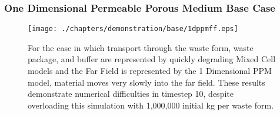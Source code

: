 \begin{frame}[ctb!]
  \frametitle{One Dimensional Permeable Porous Medium Base Case}
\begin{figure}[ht]
\texttt{[image: ./chapters/demonstration/base/1dppmff.eps]}
\caption[$^{235}U$ residence 1 Dimensional PPM Model.]{
For the case in which transport through the waste form, waste package, and 
buffer are represented by quickly degrading Mixed Cell models and the Far Field 
is represented by the 1 Dimensional PPM model, material moves very slowly into 
the far field. These results demonstrate numerical difficulties in timestep 10, 
despite overloading this simulation with 1,000,000 initial kg per waste form.
}
\label{fig:1dppmall}
\end{figure}
\end{frame}

